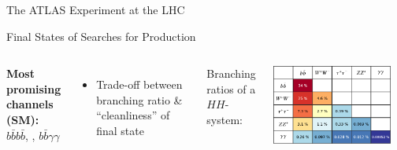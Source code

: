 \documentclass[11pt, xcolor={dvipsnames}, aspectratio=169]{beamer}
\begin{document}

\begin{frame}{The ATLAS Experiment at the LHC}
  \centering

\end{frame}


\begin{frame}{Final States of Searches for \allbold{\HH} Production}
  \begin{columns}[onlytextwidth]

    \textbf{Most promising
      channels (SM):}\\
    $b\bar{b}b\bar{b}$, \bbtautau, $b\bar{b}\gamma\gamma$
    \begin{itemize}
    \item Trade-off between branching ratio \& ``cleanliness'' of final state
    \end{itemize}

    \centering

    {\small Branching ratios of a $HH$-system:}

    \vspace*{0.5em}

    \includegraphics[width=0.9\textwidth]{theory/di_higgs_branching_ratio}
  \end{columns}
\end{frame}
\end{document}
